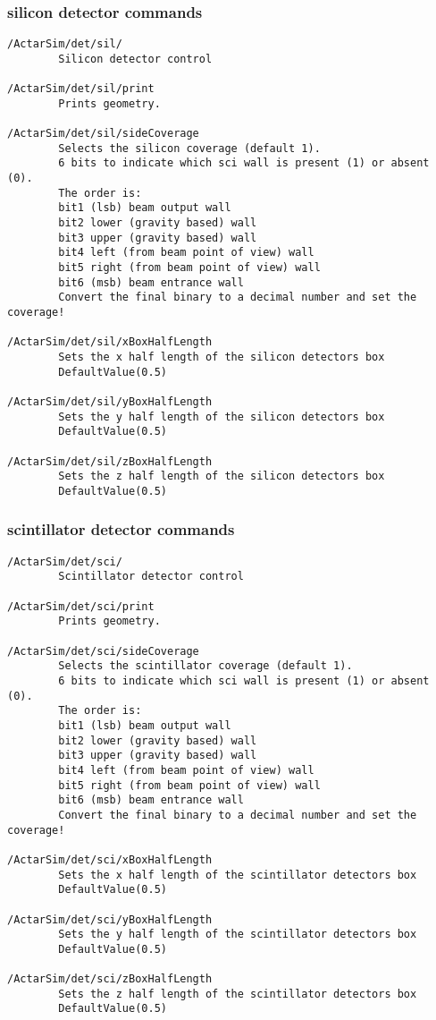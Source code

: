 \subsubsection{silicon detector commands}
\begin{verbatim}
/ActarSim/det/sil/
        Silicon detector control

/ActarSim/det/sil/print
        Prints geometry.

/ActarSim/det/sil/sideCoverage
        Selects the silicon coverage (default 1).
        6 bits to indicate which sci wall is present (1) or absent (0).
        The order is:
        bit1 (lsb) beam output wall
        bit2 lower (gravity based) wall
        bit3 upper (gravity based) wall
        bit4 left (from beam point of view) wall
        bit5 right (from beam point of view) wall
        bit6 (msb) beam entrance wall
        Convert the final binary to a decimal number and set the coverage!

/ActarSim/det/sil/xBoxHalfLength
        Sets the x half length of the silicon detectors box
        DefaultValue(0.5)

/ActarSim/det/sil/yBoxHalfLength
        Sets the y half length of the silicon detectors box
        DefaultValue(0.5)

/ActarSim/det/sil/zBoxHalfLength
        Sets the z half length of the silicon detectors box
        DefaultValue(0.5)
\end{verbatim}

\subsubsection{scintillator detector commands}
\begin{verbatim}
/ActarSim/det/sci/
        Scintillator detector control

/ActarSim/det/sci/print
        Prints geometry.

/ActarSim/det/sci/sideCoverage
        Selects the scintillator coverage (default 1).
        6 bits to indicate which sci wall is present (1) or absent (0).
        The order is:
        bit1 (lsb) beam output wall
        bit2 lower (gravity based) wall
        bit3 upper (gravity based) wall
        bit4 left (from beam point of view) wall
        bit5 right (from beam point of view) wall
        bit6 (msb) beam entrance wall
        Convert the final binary to a decimal number and set the coverage!

/ActarSim/det/sci/xBoxHalfLength
        Sets the x half length of the scintillator detectors box
        DefaultValue(0.5)

/ActarSim/det/sci/yBoxHalfLength
        Sets the y half length of the scintillator detectors box
        DefaultValue(0.5)

/ActarSim/det/sci/zBoxHalfLength
        Sets the z half length of the scintillator detectors box
        DefaultValue(0.5)
\end{verbatim}

